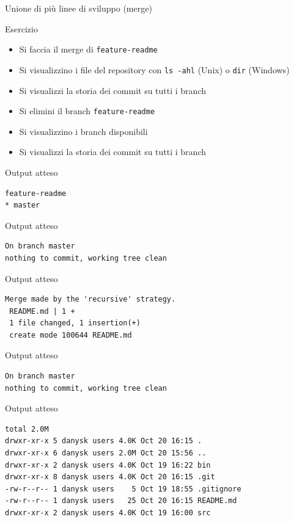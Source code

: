 \documentclass[presentation]{beamer}
\begin{document}
\begin{frame}{Unione di più linee di sviluppo (merge)}
\begin{block}{Esercizio}
\begin{itemize}
			\item Si faccia il merge di \texttt{feature-readme}
			\item Si visualizzino i file del repository con \texttt{ls -ahl} (Unix) o \texttt{dir} (Windows)
			\item Si visualizzi la storia dei commit su tutti i branch
			\item Si elimini il branch \texttt{feature-readme}
			\item Si visualizzino i branch disponibili
			\item Si visualizzi la storia dei commit su tutti i branch
		\end{itemize}
	\end{block}
	\begin{block}{Output atteso}
		\begin{Verbatim}[fontsize=\scriptsize]
  feature-readme
* master
		\end{Verbatim}
	\end{block}
	\begin{block}{Output atteso}
		\begin{Verbatim}[fontsize=\scriptsize]
On branch master
nothing to commit, working tree clean
		\end{Verbatim}
	\end{block}
	\begin{block}{Output atteso}
		\begin{Verbatim}[fontsize=\scriptsize]
Merge made by the 'recursive' strategy.
 README.md | 1 +
 1 file changed, 1 insertion(+)
 create mode 100644 README.md
		\end{Verbatim}
	\end{block}
	\begin{block}{Output atteso}
		\begin{Verbatim}[fontsize=\scriptsize]
On branch master
nothing to commit, working tree clean
		\end{Verbatim}
	\end{block}
	\begin{block}{Output atteso}
		\begin{Verbatim}[fontsize=\scriptsize]
total 2.0M
drwxr-xr-x 5 danysk users 4.0K Oct 20 16:15 .
drwxr-xr-x 6 danysk users 2.0M Oct 20 15:56 ..
drwxr-xr-x 2 danysk users 4.0K Oct 19 16:22 bin
drwxr-xr-x 8 danysk users 4.0K Oct 20 16:15 .git
-rw-r--r-- 1 danysk users    5 Oct 19 18:55 .gitignore
-rw-r--r-- 1 danysk users   25 Oct 20 16:15 README.md
drwxr-xr-x 2 danysk users 4.0K Oct 19 16:00 src
		\end{Verbatim}
	\end{block}

\end{frame}
\end{document}
